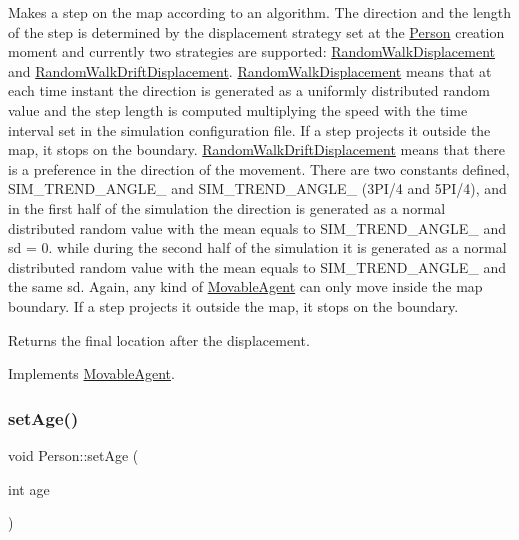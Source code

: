 Makes a step on the map according to an algorithm. The direction and the length of the step is determined by the displacement strategy set at the \hyperlink{class_person}{Person} creation moment and currently two strategies are supported\+: \hyperlink{class_random_walk_displacement}{Random\+Walk\+Displacement} and \hyperlink{class_random_walk_drift_displacement}{Random\+Walk\+Drift\+Displacement}. \hyperlink{class_random_walk_displacement}{Random\+Walk\+Displacement} means that at each time instant the direction is generated as a uniformly distributed random value and the step length is computed multiplying the speed with the time interval set in the simulation configuration file. If a step projects it outside the map, it stops on the boundary. \hyperlink{class_random_walk_drift_displacement}{Random\+Walk\+Drift\+Displacement} means that there is a preference in the direction of the movement. There are two constants defined, S\+I\+M\+\_\+\+T\+R\+E\+N\+D\+\_\+\+A\+N\+G\+L\+E\+\_ and S\+I\+M\+\_\+\+T\+R\+E\+N\+D\+\_\+\+A\+N\+G\+L\+E\+\_ (3\+P\+I/4 and 5\+P\+I/4), and in the first half of the simulation the direction is generated as a normal distributed random value with the mean equals to S\+I\+M\+\_\+\+T\+R\+E\+N\+D\+\_\+\+A\+N\+G\+L\+E\+\_ and sd = 0. while during the second half of the simulation it is generated as a normal distributed random value with the mean equals to S\+I\+M\+\_\+\+T\+R\+E\+N\+D\+\_\+\+A\+N\+G\+L\+E\+\_ and the same sd. Again, any kind of \hyperlink{class_movable_agent}{Movable\+Agent} can only move inside the map boundary. If a step projects it outside the map, it stops on the boundary. \begin{DoxyReturn}{Returns}
the final location after the displacement. 
\end{DoxyReturn}


Implements \hyperlink{class_movable_agent_a88b617f0e78c817634e5b587da045ab0}{Movable\+Agent}.

\mbox{\label{class_person_ac8ade54c27a0657c987c395ff04a9d46}} 
\subsubsection{\texorpdfstring{set\+Age()}{setAge()}}
{\footnotesize\ttfamily void Person\+::set\+Age (\begin{DoxyParamCaption}\item[{int}]{age }\end{DoxyParamCaption})}

